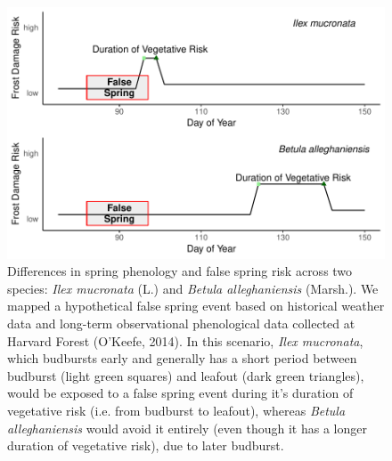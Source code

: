 \documentclass{article}\usepackage[]{graphicx}\usepackage[]{color}
\makeatletter
\def\maxwidth{ %
  \ifdim\Gin@nat@width>\linewidth
    \linewidth
  \else
    \Gin@nat@width
  \fi
}
\makeatother
\begin{document}
\begin{figure}[H]

{\centering \includegraphics[width=\maxwidth]{figure/risk-1} 

}

\caption{Differences in spring phenology and false spring risk across two species: \textit{Ilex mucronata} (L.) and \textit{Betula alleghaniensis} (Marsh.). We mapped a hypothetical false spring event based on historical weather data and long-term observational phenological data collected at Harvard Forest (O'Keefe, 2014). In this scenario, \textit{Ilex mucronata}, which budbursts early and generally has a short period between budburst (light green squares) and leafout (dark green triangles), would be exposed to a false spring event during it's duration of vegetative risk (i.e. from budburst to leafout), whereas \textit{Betula alleghaniensis} would avoid it entirely (even though it has a longer duration of vegetative risk), due to later budburst.}\label{fig:risk}
\end{figure}
\end{document}
